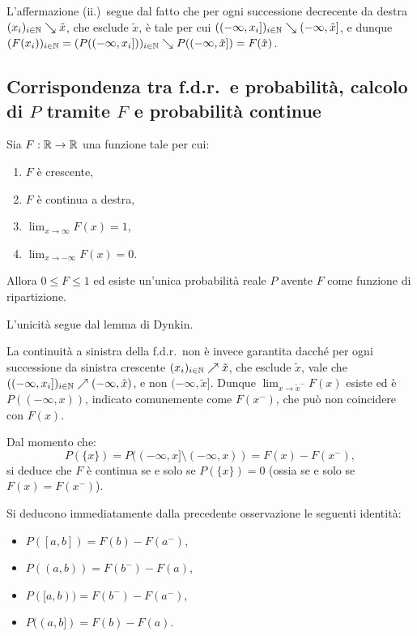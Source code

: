 \begin{multicols*}{2}
\begin{proposition}
    L'affermazione (ii.)~segue dal fatto che per ogni successione decrecente da destra $(x_i)_{i \in \mathbb{N}} \searrow \tilde{x}$,
    che esclude $\tilde{x}$, è
    tale per cui $((-\infty, x_i])_{i \in \mathbb{N}} \searrow (-\infty, \tilde{x}]$, e dunque
    $(F(x_i))_{i \in \mathbb{N}} = (P((-\infty, x_i]))_{i \in \mathbb{N}} \searrow P((-\infty, \tilde{x}]) = F(\tilde{x})$.
\end{proposition}

\subsection{Corrispondenza tra f.d.r.~e probabilità, calcolo di \texorpdfstring{$P$}{P} tramite \texorpdfstring{$F$}{F} e probabilità continue}

\begin{proposition}
    \label{prop:unicita_fdr}
    Sia $F : \mathbb{R} \to \mathbb{R}$ una funzione tale per cui:
    \begin{enumerate}[(i.)]
        \item $F$ è crescente,
        \item $F$ è continua a destra,
        \item $\lim_{x \to \infty} F(x) = 1$,
        \item $\lim_{x \to -\infty} F(x) = 0$.
    \end{enumerate}
    Allora $0 \leq F \leq 1$ ed esiste un'unica probabilità reale $P$ avente
    $F$ come funzione di ripartizione. \smallskip


    L'unicità segue dal lemma di Dynkin.
\end{proposition}

\begin{remark}
    La continuità a sinistra della f.d.r.~non è invece garantita dacché per ogni successione da sinistra crescente
    $(x_i)_{i \in \mathbb{N}} \nearrow \tilde{x}$, che esclude $\tilde{x}$,
    vale che $((-\infty, x_i])_{i \in \mathbb{N}} \nearrow (-\infty, \tilde{x})$, e non
    $(-\infty, \tilde{x}]$. Dunque $\lim_{x \to \tilde{x}^-} F(x)$ esiste ed è $P((-\infty, x))$, indicato
    comunemente come $F(x^-)$, che può non coincidere con $F(x)$. \smallskip

    Dal momento che:
    \[
        P(\{x\}) = P((-\infty, x] \setminus (-\infty, x)) = F(x) - F(x^-),
    \]
    si deduce che $F$ è continua se e solo se $P(\{x\}) = 0$ (ossia se e solo se
    $F(x) = F(x^-)$).
\end{remark}

\begin{remark}
    Si deducono immediatamente dalla precedente osservazione le seguenti identità:
    \begin{itemize}
        \item $P([a, b]) = F(b) - F(a^-)$,
        \item $P((a, b)) = F(b^-) - F(a)$,
        \item $P([a, b)) = F(b^-) - F(a^-)$,
        \item $P((a, b]) = F(b) - F(a)$.
    \end{itemize} 
\end{remark}


\end{multicols*}
